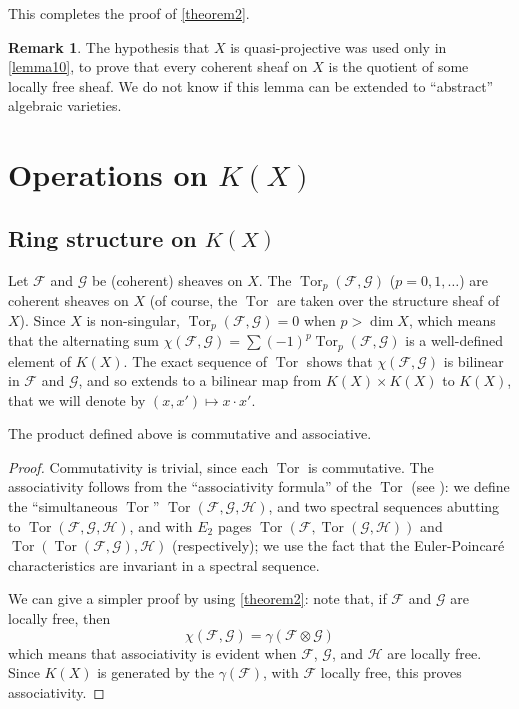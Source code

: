 \documentclass{article}
\theoremstyle{plain}
\newenvironment{proposition}[1]
    {\renewcommand\theinnercustomproposition{#1}\innercustomproposition}
    {\endinnercustomproposition}
\theoremstyle{definition}
\newtheorem*{remark}{Remark}
\newcommand{\sh}[1]{{\mathscr{#1}}}
\DeclareMathOperator{\Tor}{Tor}
\newcommand{\oldpage}[1]{\marginpar{\footnotesize$\Big\vert$ \textit{p.~#1}}}
\begin{document}
This completes the proof of \cref{theorem2}.

\begin{remark}
  The hypothesis that $X$ is quasi-projective was used only in \cref{lemma10}, to prove that every coherent sheaf on $X$ is the quotient of some locally free sheaf.
  We do not know if this lemma can be extended to ``abstract'' algebraic varieties.
\end{remark}


\section{Operations on \texorpdfstring{$K(X)$}{K(X)}}
\label{section5}

\subsection{Ring structure on \texorpdfstring{$K(X)$}{K(X)}}
\label{subsection5a}

Let $\sh{F}$ and $\sh{G}$ be (coherent) sheaves on $X$.
The $\Tor_p(\sh{F},\sh{G})$ ($p=0,1,\ldots$) are coherent sheaves on $X$ (of course, the $\Tor$
\oldpage{109}
are taken over the structure sheaf of $X$).
Since $X$ is non-singular, $\Tor_p(\sh{F},\sh{G})=0$ when $p>\dim X$, which means that the alternating sum $\chi(\sh{F},\sh{G})=\sum(-1)^p\Tor_p(\sh{F},\sh{G})$ is a well-defined element of $K(X)$.
The exact sequence of $\Tor$ shows that $\chi(\sh{F},\sh{G})$ is bilinear in $\sh{F}$ and $\sh{G}$, and so extends to a bilinear map from $K(X)\times K(X)$ to $K(X)$, that we will denote by $(x,x')\mapsto x\cdot x'$.

\begin{proposition}{6}
\label{proposition6}
  The product defined above is commutative and associative.
\end{proposition}

\begin{proof}
  Commutativity is trivial, since each $\Tor$ is commutative.
  The associativity follows from the ``associativity formula'' of the $\Tor$ (see \cite{3}):
  we define the ``simultaneous $\Tor$'' $\Tor(\sh{F},\sh{G},\sh{H})$, and two spectral sequences abutting to $\Tor(\sh{F},\sh{G},\sh{H})$, and with $E_2$ pages $\Tor(\sh{F},\Tor(\sh{G},\sh{H}))$ and $\Tor(\Tor(\sh{F},\sh{G}),\sh{H})$ (respectively);
  we use the fact that the Euler-Poincar\'{e} characteristics are invariant in a spectral sequence.

  We can give a simpler proof by using \cref{theorem2}:
  note that, if $\sh{F}$ and $\sh{G}$ are locally free, then
  \[
    \chi(\sh{F},\sh{G}) = \gamma(\sh{F}\otimes\sh{G})
  \]
  which means that associativity is evident when $\sh{F}$, $\sh{G}$, and $\sh{H}$ are locally free.
  Since $K(X)$ is generated by the $\gamma(\sh{F})$, with $\sh{F}$ locally free, this proves associativity.
\end{proof}
\end{document}
